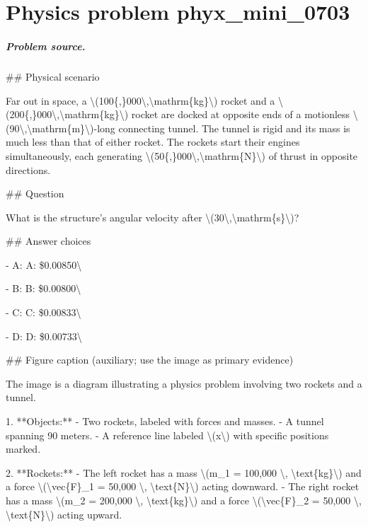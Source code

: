 
\chapter{Physics problem phyx\_mini\_0703}
\label{ch:PhyXMiniProblems_problem_phyx_mini_0703}

\paragraph{Problem source.}
\#\# Physical scenario

Far out in space, a \textbackslash{}(100\{,\}000\textbackslash{},\textbackslash{}mathrm\{kg\}\textbackslash{}) rocket and a \textbackslash{}(200\{,\}000\textbackslash{},\textbackslash{}mathrm\{kg\}\textbackslash{}) rocket are docked at opposite ends of a motionless \textbackslash{}(90\textbackslash{},\textbackslash{}mathrm\{m\}\textbackslash{})-long connecting tunnel. The tunnel is rigid and its mass is much less than that of either rocket. The rockets start their engines simultaneously, each generating \textbackslash{}(50\{,\}000\textbackslash{},\textbackslash{}mathrm\{N\}\textbackslash{}) of thrust in opposite directions.

\#\# Question

What is the structure's angular velocity after \textbackslash{}(30\textbackslash{},\textbackslash{}mathrm\{s\}\textbackslash{})?

\#\# Answer choices

- A: A: \$0.00850\textbackslash{}

- B: B: \$0.00800\textbackslash{}

- C: C: \$0.00833\textbackslash{}

- D: D: \$0.00733\textbackslash{}

\#\# Figure caption (auxiliary; use the image as primary evidence)

The image is a diagram illustrating a physics problem involving two rockets and a tunnel.

1. **Objects:**
   - Two rockets, labeled with forces and masses.
   - A tunnel spanning 90 meters.
   - A reference line labeled \textbackslash{}(x\textbackslash{}) with specific positions marked.

2. **Rockets:**
   - The left rocket has a mass \textbackslash{}(m\_1 = 100,000 \textbackslash{}, \textbackslash{}text\{kg\}\textbackslash{}) and a force \textbackslash{}(\textbackslash{}vec\{F\}\_1 = 50,000 \textbackslash{}, \textbackslash{}text\{N\}\textbackslash{}) acting downward.
   - The right rocket has a mass \textbackslash{}(m\_2 = 200,000 \textbackslash{}, \textbackslash{}text\{kg\}\textbackslash{}) and a force \textbackslash{}(\textbackslash{}vec\{F\}\_2 = 50,000 \textbackslash{}, \textbackslash{}text\{N\}\textbackslash{}) acting upward.

